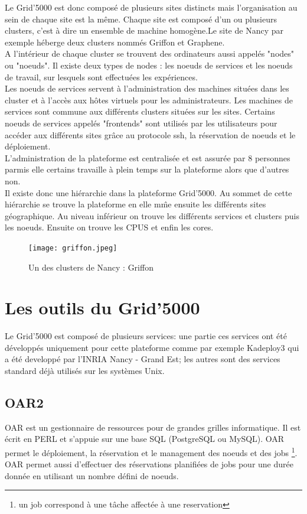 \documentclass[a4paper, 10pt, onecolumn]{report}
\begin{document}
Le Grid'5000 est donc composé de plusieurs sites distincts mais l'organisation au sein de chaque site est la même. Chaque site est composé d'un ou plusieurs clusters, c'est à dire un ensemble de machine homogène.Le site de Nancy par exemple héberge deux clusters nommés Griffon et Graphene. \\
A l'intérieur de chaque cluster se trouvent des ordinateurs aussi appelés "nodes" ou "noeuds". Il existe deux types de nodes : les noeuds de services et les noeuds de travail, sur lesquels sont effectuées les expériences.\\
 Les noeuds de services servent à l'administration des machines situées dans les cluster et à l'accès aux hôtes virtuels pour les administrateurs. Les machines de services sont commune aux différents clusters situées sur les sites. Certains noeuds de services appelés "frontends" sont utilisés par les utilisateurs pour accéder aux différents sites grâce au protocole ssh, la réservation de noeuds et le déploiement. \\
L'administration de la plateforme est centralisée et est assurée par 8 personnes parmis elle certains travaille à plein temps sur la plateforme alors que d'autres non.\\
Il existe donc une hiérarchie dans la plateforme Grid'5000. Au sommet de cette hiérarchie se trouve la plateforme en elle m\^me ensuite les différents sites géographique. Au niveau inférieur on trouve les différents services et clusters puis les noeuds.  Ensuite on trouve les CPUS et enfin les cores.
\begin{figure}[!h]
		\centering
   		\texttt{[image: griffon.jpeg]}
   		\caption{Un des clusters de Nancy : Griffon}
    	\label{fig:griffon}
	\end{figure}
	
	\section{Les outils du Grid'5000}
		Le Grid'5000 est composé de plusieurs services: une partie ces services ont été développés uniquement pour cette plateforme comme par exemple Kadeploy3 qui a été developpé par l'INRIA Nancy - Grand Est; les autres sont des services standard déjà utilisés sur les systèmes Unix.  
		\subsection{OAR2}			
			OAR est un gestionnaire de ressources pour de grandes grilles informatique. Il est écrit en PERL et s'appuie sur une base SQL (PostgreSQL ou MySQL). OAR permet le déploiement, la réservation  et le management des noeuds et des jobs \footnote{un job correspond à une t\^ache affectée à une reservation}. OAR permet aussi d'effectuer des réservations planifiées de jobs pour une durée donnée en utilisant un nombre défini de noeuds. \\
			
\end{document}
